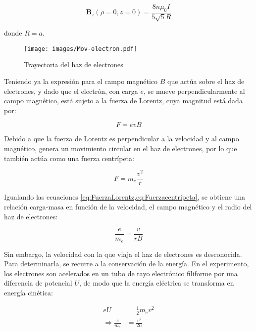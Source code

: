 \begin{equation}
    \mathbf{B}_{z}(\rho=0, z=0) = \frac{8 n \mu_{0} I}{5 \sqrt{5} R}
    \label{eq:Campo_magnetico_enHaz}
\end{equation}

donde \( R = a \).

\begin{figure}[H]
    \centering
    \texttt{[image: images/Mov-electron.pdf]}
    \caption{Trayectoria del haz de electrones}
    \label{fig:haz_elelctrones}
\end{figure}

Teniendo ya la expresión para el campo magnético \( B \) que actúa sobre el haz de electrones, y dado que el electrón, con carga \( e \), se mueve perpendicularmente al campo magnético, está sujeto a la fuerza de Lorentz, cuya magnitud está dada por:

\begin{equation}
    F = e v B
    \label{eq:FuerzaLorentz}
\end{equation}

Debido a que la fuerza de Lorentz es perpendicular a la velocidad y al campo magnético, genera un movimiento circular en el haz de electrones, por lo que también actúa como una fuerza centrípeta:

\begin{equation}
    F = m_{e} \frac{v^{2}}{r}
    \label{eq:Fuerzacentripeta}
\end{equation}

Igualando las ecuaciones \cref{eq:FuerzaLorentz,eq:Fuerzacentripeta}, se obtiene una relación carga-masa en función de la velocidad, el campo magnético y el radio del haz de electrones:

\begin{equation}
    \frac{e}{m_{e}} = \frac{v}{r B}
    \label{eq:Primera_carga-masa}
\end{equation}

Sin embargo, la velocidad con la que viaja el haz de electrones es desconocida. Para determinarla, se recurre a la conservación de la energía. En el experimento, los electrones son acelerados en un tubo de rayo electrónico filiforme por una diferencia de potencial \( U \), de modo que la energía eléctrica se transforma en energía cinética:

\begin{equation}
\begin{aligned}
    e U &= \frac{1}{2} m_{e} v^{2} \\
    \Rightarrow \frac{e}{m_{e}} &= \frac{v^{2}}{2 U}
\end{aligned}
\label{eq:Segunda_carga-masa}
\end{equation}

